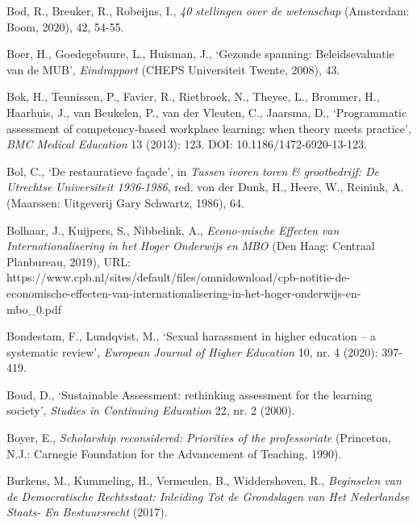\documentclass[smallauthor, chapterhaspagenum, nochapterinheader, pagenuminheader,  bigchapnum,medium2, tocpages, garamond, titleinheader]{jote-book}
\begin{document}
\begin{references}
		Bod, R., Breuker, R., Robeijns, I., \emph{40 }\emph{stellingen}\emph{ over de }\emph{wetenschap} (Amsterdam: Boom, 2020), 42, 54-55.



		Boer, H., Goedegebuure, L., Huisman, J., ‘Gezonde spanning: Beleidsevaluatie van de MUB', \emph{Eindrapport}\emph{ }(CHEPS Universiteit Twente, 2008), 43.



		Bok, H., Teunissen, P., Favier, R., Rietbroek, N., Theyse, L., Brommer, H., Haarhuis, J., van Beukelen, P., van der Vleuten, C., Jaarsma, D., ‘Programmatic assessment of competency-based workplace learning: when theory meets practice', \emph{BMC Medical Education} 13 (2013): 123. DOI: 10.1186/1472-6920-13-123.



		Bol, C., ‘De restauratieve façade', in \emph{Tussen}\emph{ }\emph{ivoren}\emph{ }\emph{toren}\emph{ \& }\emph{grootbedrijf}\emph{: De }\emph{Utrechtse}\emph{ Universiteit 1936-1986}, red. von der Dunk, H., Heere, W., Reinink, A. (Maarssen: Uitgeverij Gary Schwartz, 1986), 64.



		Bolhaar, J., Kuijpers, S., Nibbelink, A., \emph{Econo-mische}\emph{ }\emph{Effecten}\emph{ van }\emph{Internationalisering}\emph{ in het }\emph{Hoger}\emph{ }\emph{Onderwijs}\emph{ }\emph{en}\emph{ MBO} (Den Haag: Centraal Planbureau, 2019), URL: https://www.cpb.nl/sites/default/files/omnidownload/cpb-notitie-de-economische-effecten-van-internationalisering-in-het-hoger-onderwijs-en-mbo\_0.pdf



		Bondestam, F., Lundqvist, M., ‘Sexual harassment in higher education -- a systematic review', \emph{European Journal of Higher Education} 10, nr. 4 (2020): 397-419.



		Boud, D., ‘Sustainable Assessment: rethinking assessment for the learning society', \emph{Studies in Continuing Education} 22, nr. 2 (2000).



		Boyer, E., \emph{Scholarship reconsidered: Priorities of the professoriate} (Princeton, N.J.: Carnegie Foundation for the Advancement of Teaching, 1990).



		Burkens, M., Kummeling, H., Vermeulen, B., Widdershoven, R., \emph{Beginselen van de Democratische Rechtsstaat: Inleiding Tot de Grondslagen van Het Nederlandse Staats- En Bestuursrecht} (2017).




\end{references}
\end{document}
